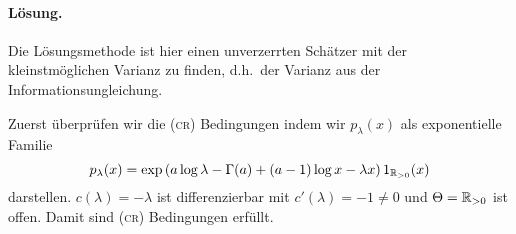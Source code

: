 \paragraph*{Lösung.  } Die Lösungsmethode ist hier einen unverzerrten Schätzer mit der
kleinstmöglichen Varianz zu finden, d.h.\ der Varianz aus der Informationsungleichung.

Zuerst überprüfen wir die (\textsc{cr}) Bedingungen indem wir $p_\lambda(x)$ als
exponentielle Familie
\begin{equation*}
    p_\lambda(x) = \exp\left( a\log \lambda -\Gamma(a) +(a-1)\log x -\lambda x  \right) 1_{\mathbb R_{>0}}(x)    
\end{equation*}
darstellen. $c(\lambda)=-\lambda$ ist differenzierbar mit $c'(\lambda)=-1\neq 0$ und 
$\Theta=\mathbb R_{>0}$ ist offen. Damit sind \textsc{(cr)} Bedingungen erfüllt.

